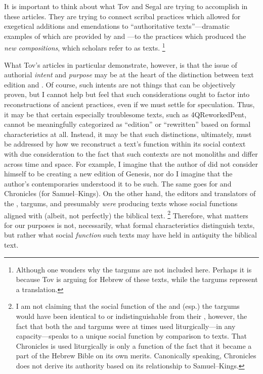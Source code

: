 It is important to think about what Tov and Segal are trying to accomplish in these articles. They are trying to connect scribal practices which allowed for exegetical additions and emendations to ``authoritative texts''---dramatic examples of which are provided by \sampent and \lxx---to the practices which produced the \emph{new compositions}, which scholars refer to as \rwb texts.%
    \footnote{%
        Although one wonders why the targums are not included here. Perhaps it is because Tov is arguing for Hebrew \vorlagen of these texts, while the targums represent a translation.}

What Tov's articles in particular demonstrate, however, is that the issue of authorial \emph{intent} and \emph{purpose} may be at the heart of the distinction between text edition and \rwb. Of course, such intents are not things that can be objectively proven, but I cannot help but feel that such considerations ought to factor into reconstructions of ancient practices, even if we must settle for speculation. Thus, it may be that certain especially troublesome texts, such as 4QReworkedPent, cannot be meaningfully categorized as ``edition'' or ``rewritten'' based on formal characteristics at all. Instead, it may be that such distinctions, ultimately, must be addressed by how we reconstruct a text's function within its social context with due consideration to the fact that such contexts are not monoliths and differ across time and space. For example, I imagine that the author of \ga did not consider himself to be creating a new edition of Genesis, nor do I imagine that the author's contemporaries understood it to be such. The same goes for \jub and Chronicles (for Samuel--Kings). On the other hand, the editors and translators of the \sampent, targums, and \lxx presumably \emph{were} producing texts whose social functions aligned with (albeit, not perfectly) the biblical text.%
    \footnote{%
        I am not claiming that the social function of the \lxx and (esp.) the targums would have been identical to or indistinguishable from their \vorlagen, however, the fact that both the \lxx and targums were at times used liturgically---in any capacity---speaks to a unique social function by comparison to \rwb texts. That Chronicles is used liturgically is only a function of the fact that it became a part of the Hebrew Bible on its own merits. Canonically speaking, Chronicles does not derive its authority based on its relationship to Samuel--Kings.}
%
Therefore, what matters for our purposes is not, necessarily, what formal characteristics distinguish \rwb texts, but rather what social \emph{function} such texts may have held in antiquity \visavis the biblical text.

